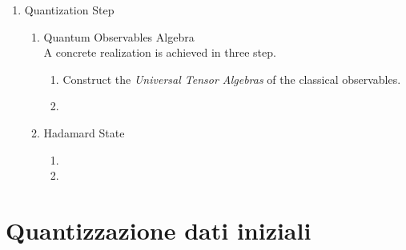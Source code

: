 \documentclass[Main]{subfiles}
\begin{document}
\begin{enumerate}
   		\item Quantization Step
   		   	\begin{enumerate}
   				\item Quantum Observables Algebra\\
   					A concrete realization is achieved in three step.
   					\begin{enumerate}
   						\item Construct the \emph{Universal Tensor Algebras} of the classical observables.
   						\item
   					\end{enumerate}
   					
   				\item Hadamard State
   				   	\begin{enumerate}
   						\item
   						\item
   					\end{enumerate}
   				 
   			\end{enumerate}
 	\end{enumerate}
 	
 	\section{Quantizzazione dati iniziali}
\end{document}
